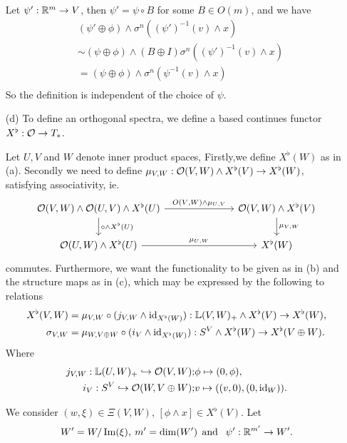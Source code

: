 \begin{exercise}[2]
\begin{enumerate}
Let $\psi' : \mathbb{R}^m \to V$, then $\psi' = \psi \circ B$ for some $B \in O(m)$, and
we have
\begin{align*}
&(\psi' \oplus \phi) \wedge \sigma^n ((\psi')^{-1}(v) \wedge x) \\
&\sim (\psi \oplus \phi) \wedge (B \oplus I)\sigma^n ((\psi')^{-1}(v) \wedge x) \\
&= (\psi \oplus \phi) \wedge \sigma^n (\psi^{-1}(v) \wedge x) \\
\end{align*}
So the definition is independent of the choice of $\psi$.

\item[(d)]
To define an orthogonal spectra, we define a based continues functor $X^\flat :
\mathcal{O} \to T_*$. 


Let $U, V$ and $W$ denote inner product spaces, 
Firstly,we define $X^\flat (W)$ as in (a). Secondly we need to define 
$\mu_{V,W}: \mathcal{O}(V, W) \wedge X^\flat(V) \to X^\flat(W)$, satisfying
associativity, ie. 
\[ \begin{tikzcd}[column sep = 7em]
\O(V, W) \wedge \O(U,V) \wedge X^\flat(U) 
\arrow[r, "O(V{,}W) \wedge \mu_{U{,}V}"] 
\arrow[d, "\circ \wedge X^\flat(U)"] 
& \O(V, W) \wedge X^\flat(V) 
\arrow[d, "\mu_{V{,}W}"] \\ 
\O(U,W) \wedge X^\flat(U) 
\arrow[r, "\mu_{U{,}W}"] 
& X^\flat(W)
\end{tikzcd} \]
commutes. Furthermore, we want the functionality to be given as in (b) and the
structure maps as in (c), which may be expressed by the following to relations
\begin{equation}
\begin{split}
X^\flat(V,W) &= \mu_{V, W} \circ (j_{V,W} \wedge \operatorname{id}_{X^\flat(W)}) : 
\mathbb{L}(V, W)_+ \wedge X^\flat (V) \to X^\flat(W),
\\
\sigma_{V,W} &= \mu_{W,V\oplus W} \circ (i_V \wedge \operatorname{id}_{X^\flat(W)}) :
S^V \wedge X^\flat (W) \to X^\flat(V \oplus W).
\end{split}
\end{equation}
Where 
\begin{align*}
j_{V,W} : \mathbb{L}(U,W)_+ \hookrightarrow \mathcal{O}(V,W); & \phi \mapsto (0,\phi), \\
i_V : S^V \hookrightarrow \mathcal{O}(W, V\oplus W); & v \mapsto ((v,0), (0,\operatorname{id}_W)).
\end{align*}


We consider $(w, \xi) \in \Xi(V,W)$, $[\phi \wedge x] \in X^\flat(V)$. Let 
\[ W' = W/\operatorname{Im}(\xi), \: m' = \dim(W') \:\:\text{and }\:\: \psi' : \mathbb{R}^{m'} \to W'. \]


\end{enumerate}
\end{exercise}
